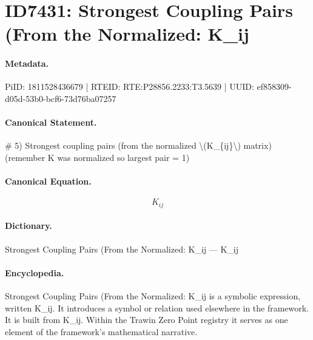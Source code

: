 \section*{ID7431: Strongest Coupling Pairs (From the Normalized: K\_ij}
\paragraph{Metadata.}
PiID: 1811528436679 | RTEID: RTE:P28856.2233:T3.5639 | UUID: ef858309-d05d-53b0-bcf6-73d76ba07257

\paragraph{Canonical Statement.}
\# 5) Strongest coupling pairs (from the normalized \textbackslash{}(K\_\{ij\}\textbackslash{}) matrix) (remember K was normalized so largest pair = 1)

\paragraph{Canonical Equation.}
\[
K_{ij}
\]

\paragraph{Dictionary.}
Strongest Coupling Pairs (From the Normalized: K\_ij — K\_ij

\paragraph{Encyclopedia.}
Strongest Coupling Pairs (From the Normalized: K\_ij is a symbolic expression, written K\_ij. It introduces a symbol or relation used elsewhere in the framework. It is built from K\_ij. Within the Trawin Zero Point registry it serves as one element of the framework's mathematical narrative.
